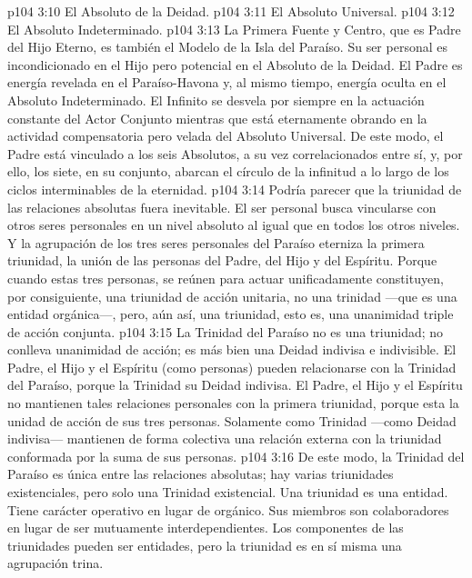 \vs p104 3:10 El Absoluto de la Deidad.
\vs p104 3:11 El Absoluto Universal.
\vs p104 3:12 El Absoluto Indeterminado.
\vs p104 3:13 \pc La Primera Fuente y Centro, que es Padre del Hijo Eterno, es también el Modelo de la Isla del Paraíso. Su ser personal es incondicionado en el Hijo pero potencial en el Absoluto de la Deidad. El Padre es energía revelada en el Paraíso\hyp{}Havona y, al mismo tiempo, energía oculta en el Absoluto Indeterminado. El Infinito se desvela por siempre en la actuación constante del Actor Conjunto mientras que está eternamente obrando en la actividad compensatoria pero velada del Absoluto Universal. De este modo, el Padre está vinculado a los seis Absolutos, a su vez correlacionados entre sí, y, por ello, los siete, en su conjunto, abarcan el círculo de la infinitud a lo largo de los ciclos interminables de la eternidad.
\vs p104 3:14 \pc Podría parecer que la triunidad de las relaciones absolutas fuera inevitable. El ser personal busca vincularse con otros seres personales en un nivel absoluto al igual que en todos los otros niveles. Y la agrupación de los tres seres personales del Paraíso eterniza la primera triunidad, la unión de las personas del Padre, del Hijo y del Espíritu. Porque cuando estas tres personas,  se reúnen para actuar unificadamente constituyen, por consiguiente, una triunidad de acción unitaria, no una trinidad ---que es una entidad orgánica---, pero, aún así, una triunidad, esto es, una unanimidad triple de acción conjunta.
\vs p104 3:15 La Trinidad del Paraíso no es una triunidad; no conlleva unanimidad de acción; es más bien una Deidad indivisa e indivisible. El Padre, el Hijo y el Espíritu (como personas) pueden relacionarse con la Trinidad del Paraíso, porque la Trinidad  su Deidad indivisa. El Padre, el Hijo y el Espíritu no mantienen tales relaciones personales con la primera triunidad, porque esta  la unidad de acción de sus tres personas. Solamente como Trinidad ---como Deidad indivisa--- mantienen de forma colectiva una relación externa con la triunidad conformada por la suma de sus personas.
\vs p104 3:16 De este modo, la Trinidad del Paraíso es única entre las relaciones absolutas; hay varias triunidades existenciales, pero solo una Trinidad existencial. Una triunidad  es una entidad. Tiene carácter operativo en lugar de orgánico. Sus miembros son colaboradores en lugar de ser mutuamente interdependientes. Los componentes de las triunidades pueden ser entidades, pero la triunidad es en sí misma una agrupación trina.
